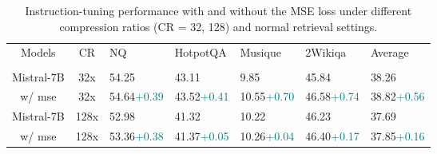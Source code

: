 \documentclass{applemlr}
\numberwithin{equation}{section}
\begin{document}
\begin{table}[H]
\centering
\scriptsize
\begin{tabular}{cclllll}
\bottomrule
Models & CR & NQ & HotpotQA& Musique& 2Wikiqa & Average \\
\rowcolor{gray!15}
\multicolumn{7}{c}{\textbf{Normal}} \\
Mistral-7B & 32x & 54.25 & 43.11 & 9.85 & 45.84 & 38.26 \\
\qquad w/ mse & 32x & 54.64{\tiny\textcolor{teal}{+0.39}} & 43.52{\tiny\textcolor{teal}{+0.41}} & 10.55{\tiny\textcolor{teal}{+0.70}} & 46.58{\tiny\textcolor{teal}{+0.74}} & 38.82{\tiny\textcolor{teal}{+0.56}} \\
Mistral-7B & 128x & 52.98 & 41.32 & 10.22 & 46.23 & 37.69 \\
\qquad w/ mse & 128x & 53.36{\tiny\textcolor{teal}{+0.38}} & 41.37{\tiny\textcolor{teal}{+0.05}} & 10.26{\tiny\textcolor{teal}{+0.04}} & 46.40{\tiny\textcolor{teal}{+0.17}} & 37.85{\tiny\textcolor{teal}{+0.16}} \\
\toprule
\end{tabular}
\caption{Instruction-tuning performance with and without the MSE loss under different compression ratios (CR = 32, 128) and normal retrieval settings.}
\label{tab:mse_loss1}
\end{table}
\end{document}
